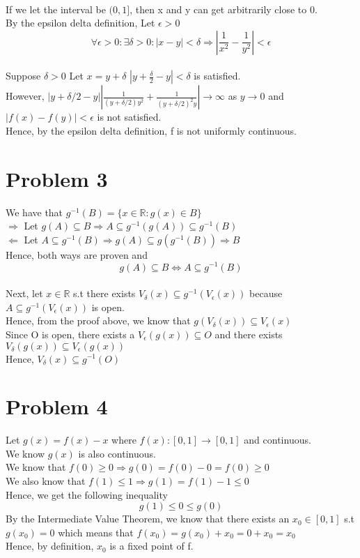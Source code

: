 \documentclass{article}
\begin{document}
\\If we let the interval be $(0, 1]$, then x and y can get arbitrarily close to 0.
\\By the epsilon delta definition, Let $\epsilon > 0$ $$\forall \epsilon > 0 : \exists \delta > 0 : |x - y| < \delta \Rightarrow |\frac{1}{x^2} - \frac{1}{y^2}| < \epsilon$$
\\Suppose $\delta > 0$ Let $x = y + \delta$
$|y + \frac{\delta}{2} - y| < \delta$ is satisfied.
\\However, $|y + \delta/2 -y||\frac{1}{(y + \delta/2)y^2} + \frac{1}{(y+\delta/2)^2y}| \to \infty$ as $y \to 0$ and $|f(x) - f(y)| < \epsilon$ is not satisfied.
\\Hence, by the epsilon delta definition, f is not uniformly continuous.

\section*{Problem 3}
We have that $g^{-1}(B) = \{x \in \mathbb{R} : g(x) \in B\}$
\\$\Rightarrow$ Let $g(A) \subseteq B \Rightarrow A \subseteq g^{-1}(g(A)) \subseteq g^{-1}(B)$
\\$\Leftarrow$ Let $A \subseteq g^{-1}(B) \Rightarrow g(A) \subseteq g(g^{-1}(B)) \Rightarrow B$
\\Hence, both ways are proven and $$g(A) \subseteq B \iff A \subseteq g^{-1}(B)$$
\\Next, let $x \in \mathbb{R}$ s.t there exists $V_\delta(x) \subseteq g^{-1}(V_\epsilon(x))$ because $A \subseteq g^{-1}(V_\epsilon(x))$ is open.
\\Hence, from the proof above, we know that $g(V_\delta(x)) \subseteq V_\epsilon(x)$
\\Since O is open, there exists a $V_\epsilon(g(x)) \subseteq O$ and there exists $V_\delta(g(x)) \subseteq V_\epsilon(g(x))$
\\Hence, $V_\delta(x) \subseteq g^{-1}(O)$

\section*{Problem 4}
Let $g(x) = f(x) - x$ where $f(x): [0, 1] \to [0, 1]$ and continuous.
\\We know $g(x)$ is also continuous.
\\We know that $f(0) \geq 0 \Rightarrow g(0) = f(0) - 0 = f(0) \geq 0$
\\We also know that $f(1) \leq 1 \Rightarrow g(1) = f(1) - 1 \leq 0$
\\Hence, we get the following inequality $$g(1) \leq 0 \leq g(0)$$
By the Intermediate Value Theorem, we know that there exists an $x_0 \in [0, 1]$ s.t $g(x_0) = 0$ which means that $f(x_0) = g(x_0) + x_0 = 0 + x_0 = x_0$
\\Hence, by definition, $x_0$ is a fixed point of f.
\end{document}

